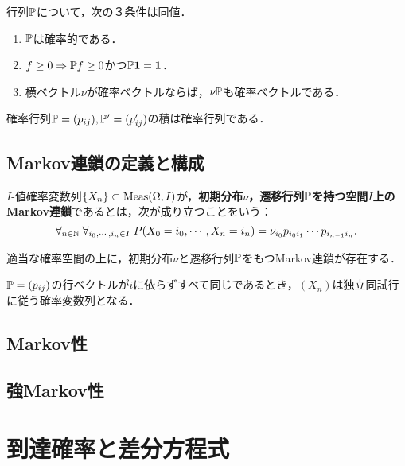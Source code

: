 \documentclass[uplatex,dvipdfmx]{jsreport}
\begin{document}
\begin{lemma}
    行列$\mathbb{P}$について，次の３条件は同値．
    \begin{enumerate}
        \item $\mathbb{P}$は確率的である．
        \item $f\ge0\Rightarrow\mathbb{P} f\ge0$かつ$\mathbb{P}\mathbf{1}=\mathbf{1}$．
        \item 横ベクトル$\nu$が確率ベクトルならば，$\nu\mathbb{P}$も確率ベクトルである．
    \end{enumerate}
\end{lemma}

\begin{lemma}
    確率行列$\mathbb{P}=(p_{ij}),\mathbb{P}'=(p'_{ij})$の積は確率行列である．
\end{lemma}

\subsection{Markov連鎖の定義と構成}

\begin{definition}
    $I$-値確率変数列$\{X_n\}\subset\mathrm{Meas}(\Omega,I)$が，\textbf{初期分布$\nu$，遷移行列$\mathbb{P}$を持つ空間$I$上のMarkov連鎖}であるとは，次が成り立つことをいう：
    \[\forall_{n\in\mathbb{N}}\;\forall_{i_0,\cdots,i_n\in I}\;P(X_0=i_0,\cdots,X_n=i_n)=\nu_{i_0}p_{i_0i_1}\cdots p_{i_{n-1}i_n}.\]
\end{definition}

\begin{proposition}
    適当な確率空間の上に，初期分布$\nu$と遷移行列$\mathbb{P}$をもつMarkov連鎖が存在する．
\end{proposition}

\begin{example}
    $\mathbb{P}=(p_{ij})$の行ベクトルが$i$に依らずすべて同じであるとき，$(X_n)$は独立同試行に従う確率変数列となる．
\end{example}

\subsection{Markov性}

\subsection{強Markov性}

\section{到達確率と差分方程式}
\end{document}
